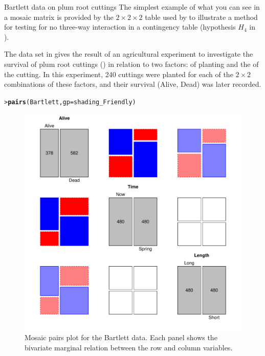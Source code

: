 \documentclass[10pt,krantz2]{krantz}\usepackage[]{graphicx}\usepackage[]{color}
\makeatletter
\newcommand{\hlstd}[1]{\textcolor[rgb]{0.345,0.345,0.345}{#1}}%
\newcommand{\hlkwc}[1]{\textcolor[rgb]{0.333,0.667,0.333}{#1}}%
\newcommand{\hlkwd}[1]{\textcolor[rgb]{0.737,0.353,0.396}{\textbf{#1}}}%
\newenvironment{kframe}{%
 \def\at@end@of@kframe{}%
 \ifinner\ifhmode%
  \def\at@end@of@kframe{\end{minipage}}%
  \begin{minipage}{\columnwidth}%
 \fi\fi%
 \def\FrameCommand##1{\hskip\@totalleftmargin \hskip-\fboxsep
 \colorbox{shadecolor}{##1}\hskip-\fboxsep
     \hskip-\linewidth \hskip-\@totalleftmargin \hskip\columnwidth}%
 \MakeFramed {\advance\hsize-\width
   \@totalleftmargin\z@ \linewidth\hsize
   \@setminipage}}%
 {\par\unskip\endMakeFramed%
 \at@end@of@kframe}
\newenvironment{knitrout}{}{} %
\renewenvironment{knitrout}{\small\renewcommand{\baselinestretch}{.85}}{} %
\makeatother
\begin{document}
\begin{Example}[bartlett]{Bartlett data on plum root cuttings}
The simplest example of what you can see in a mosaic matrix is
provided by the $2 \times 2 \times 2$ table
used by \citet{Bartlett:35}
to illustrate a method for testing for no three-way interaction in a contingency table
(hypothesis $H_4$ in ).

The data set  in 
gives the result of an agricultural experiment to
investigate the survival of plum root cuttings ()
in relation to two factors:  of planting and the  of the cutting.
In this experiment, 240 cuttings were planted for each of the $2 \times 2$ combinations of these factors, and their survival (Alive, Dead) was later recorded.

\begin{knitrout}
\color{fgcolor}\begin{kframe}
\begin{alltt}
\hlstd{> }\hlkwd{pairs}\hlstd{(Bartlett,} \hlkwc{gp} \hlstd{= shading_Friendly)}
\end{alltt}
\end{kframe}\begin{figure}[!htb]

\centerline{\includegraphics[width=.8\textwidth]{ch05/fig/bartlett-pairs-1} }

\caption[Mosaic pairs plot for the Bartlett data]{Mosaic pairs plot for the Bartlett data. Each panel shows the bivariate marginal relation between the row and column variables.}\label{fig:bartlett-pairs}
\end{figure}



\end{knitrout}
\end{Example}
\end{document}
